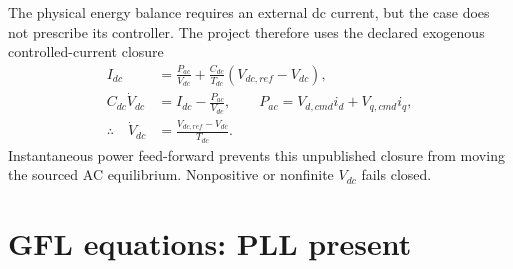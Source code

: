 \documentclass[12pt,a4paper]{article}
\begin{document}
The physical energy balance requires an external dc current, but the case does not prescribe its
controller. The project therefore uses the declared exogenous controlled-current closure
\begin{align}
I_{dc}&=\frac{P_{ac}}{V_{dc}}+\frac{C_{dc}}{T_{dc}}(V_{dc,ref}-V_{dc}),\\
C_{dc}\dot V_{dc}&=I_{dc}-\frac{P_{ac}}{V_{dc}},\qquad
P_{ac}=V_{d,cmd}i_d+V_{q,cmd}i_q,\\
\therefore\quad \dot V_{dc}&=\frac{V_{dc,ref}-V_{dc}}{T_{dc}}.
\end{align}
Instantaneous power feed-forward prevents this unpublished closure from moving the sourced AC
equilibrium. Nonpositive or nonfinite $V_{dc}$ fails closed.

\section{GFL equations: PLL present}
\end{document}
